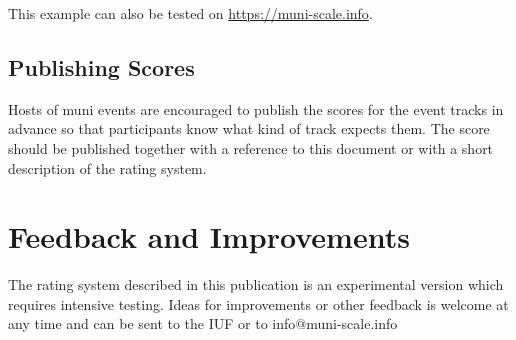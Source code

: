 \documentclass[a4paper,oneside]{scrartcl}
\begin{document}
This example can also be tested on \url{https://muni-scale.info}.

\subsection{Publishing Scores}
Hosts of muni events are encouraged to publish the scores for the event tracks
in advance so that participants know what kind of track expects them.
The score should be published together with a reference to this document or with a
short description of the rating system.

\section{Feedback and Improvements}
The rating system described in this publication is an experimental version which
requires intensive testing. Ideas for improvements or other feedback is welcome
at any time and can be sent to the IUF or to info@muni-scale.info
\end{document}
